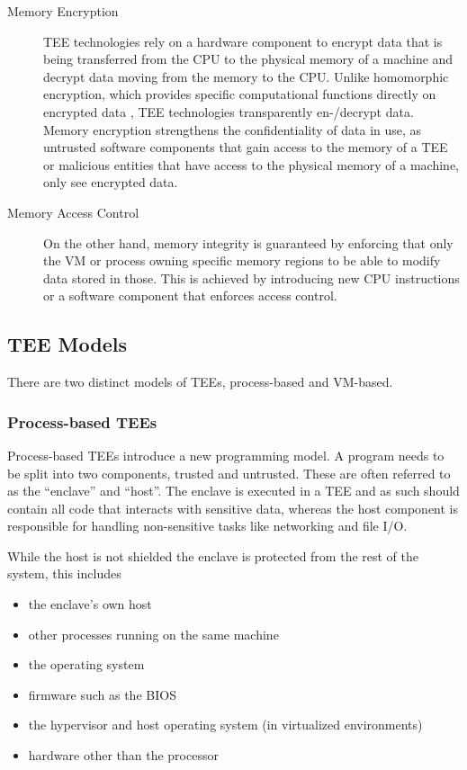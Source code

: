 \begin{description}
  \item[Memory Encryption]
    TEE technologies rely on a hardware component to encrypt data that is being
    transferred from the CPU to the physical memory of a machine and decrypt
    data moving from the memory to the CPU. Unlike homomorphic encryption, which
    provides specific computational functions directly on encrypted data
    \cite{monique2013homomorphicencryption}, TEE technologies transparently
    en-/decrypt data. Memory encryption strengthens the confidentiality of data
    in use, as untrusted software components that gain access to the memory of a
    TEE or malicious entities that have access to the physical memory of a
    machine, only see encrypted data.

  \item[Memory Access Control]
    On the other hand, memory integrity is guaranteed by enforcing that only the
    VM or process owning specific memory regions to be able to modify data
    stored in those. This is achieved by introducing new CPU instructions or a
    software component that enforces access control.
\end{description}

\subsection{TEE Models}
\label{sec:tee-models}

There are two distinct models of TEEs, process-based and VM-based.

\subsubsection{Process-based TEEs}
\label{sec:process-based-tees}

Process-based TEEs introduce a new programming model. A program needs to be
split into two components, trusted and untrusted. These are often referred to as
the ``enclave'' and ``host''. The enclave is executed in a TEE and as such
should contain all code that interacts with sensitive data, whereas the host
component is responsible for handling non-sensitive tasks like networking and
file I/O.

While the host is not shielded the enclave is protected from the rest of the
system, this includes

\begin{itemize}
  \item the enclave's own host
  \item other processes running on the same machine
  \item the operating system
  \item firmware such as the BIOS
  \item the hypervisor and host operating system (in virtualized environments)
  \item hardware other than the processor
\end{itemize}

